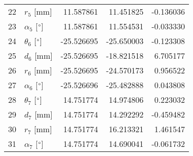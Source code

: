 \documentclass{standalone}%
\begin{document}
\begin{tabular}{llrrr}
22 &              $r_{5}$ [mm] &  11.587861 &  11.451825 &  -0.136036 \\
23 &  $\alpha_{5}$ [$\degree$] &  11.587861 &  11.554531 &  -0.033330 \\
24 &  $\theta_{6}$ [$\degree$] & -25.526695 & -25.650003 &  -0.123308 \\
25 &              $d_{6}$ [mm] & -25.526695 & -18.821518 &   6.705177 \\
26 &              $r_{6}$ [mm] & -25.526695 & -24.570173 &   0.956522 \\
27 &  $\alpha_{6}$ [$\degree$] & -25.526696 & -25.482888 &   0.043808 \\
28 &  $\theta_{7}$ [$\degree$] &  14.751774 &  14.974806 &   0.223032 \\
29 &              $d_{7}$ [mm] &  14.751774 &  14.292292 &  -0.459482 \\
30 &              $r_{7}$ [mm] &  14.751774 &  16.213321 &   1.461547 \\
31 &  $\alpha_{7}$ [$\degree$] &  14.751774 &  14.690041 &  -0.061732 \\
\bottomrule
\end{tabular}
%
\end{document}
